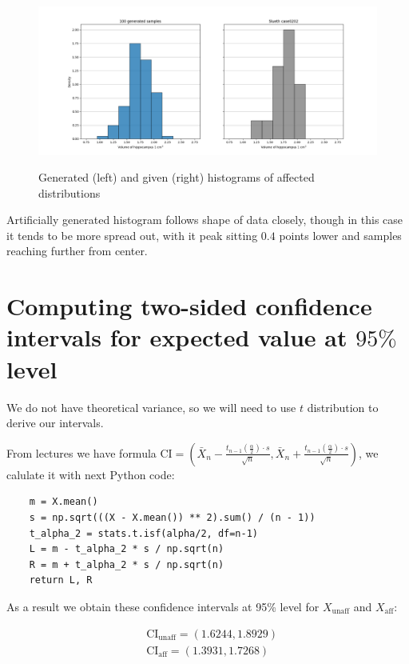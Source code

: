 \documentclass[12pt,a4paper]{article} %
\newcommand{\randv}[2][X]{#1_{\text{#2}}}
\begin{document}
\begin{figure}[H]
  \centering
  \includegraphics[width=\textwidth]{./img/comparing_generated_affected.png}
  \label{fig:comp_gen_aff}
  \caption{Generated (left) and given (right) histograms of affected distributions}
\end{figure}

Artificially generated histogram follows shape of data closely, though in this case it tends to be more spread out, with it peak sitting $0.4$ points lower and samples reaching further from center.

\section{Computing two-sided confidence intervals for expected value at $95\%$ level}

We do not have theoretical variance, so we will need to use $t$ distribution to derive our intervals. 

From lectures we have formula $ \text{CI} = \left(\bar{X}_n - \frac{t_{n-1}\left(\frac{\alpha}{2}\right) \cdot s}{\sqrt{n}}, \bar{X}_n + \frac{t_{n-1}\left(\frac{\alpha}{2}\right) \cdot s}{\sqrt{n}}\right)$, we calulate it with next Python code:

\begin{lstlisting}
    m = X.mean()
    s = np.sqrt(((X - X.mean()) ** 2).sum() / (n - 1))
    t_alpha_2 = stats.t.isf(alpha/2, df=n-1)
    L = m - t_alpha_2 * s / np.sqrt(n)
    R = m + t_alpha_2 * s / np.sqrt(n)
    return L, R
\end{lstlisting}

As a result we obtain these confidence intervals at 95\% level for $\randv{unaff}$ and $\randv{aff}$:

\begin{align*}
  &\text{CI}_{\text{unaff}} = (1.6244, 1.8929) \\
  &\text{CI}_{\text{aff}} = (1.3931, 1.7268)
\end{align*}
\end{document}
